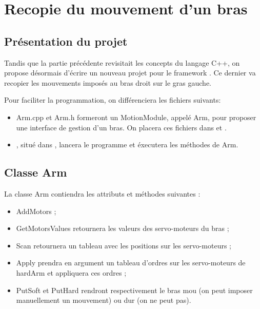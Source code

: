\documentclass[conference]{IEEEtran}
\begin{document}




\section{Recopie du mouvement d'un bras}
\label{sec:intro}

\subsection{Présentation du projet}
Tandis que la partie précédente revisitait les concepts du langage C++, on propose désormais d'écrire un nouveau projet pour le framework \darwin.
Ce dernier va recopier les mouvements imposés au bras droit sur le gras gauche.

Pour faciliter la programmation, on différenciera les fichiers suivants:
\begin{itemize}
    \item Arm.cpp et Arm.h formeront un MotionModule, appelé Arm,
    pour proposer une interface de gestion d'un bras. On placera ces fichiers dans  et .
    \item  {}, situé dans
    ,
    lancera le programme et éxecutera les méthodes de Arm.
\end{itemize}

\subsection{Classe Arm}

La classe Arm contiendra les attributs et méthodes suivantes :
\begin{itemize}
    \item AddMotors ;
    \item GetMotorsValues retournera les valeurs des servo-moteurs du bras ;
    \item Scan retournera un tableau avec les positions sur les servo-moteurs ;
    \item Apply prendra en argument un tableau d'ordres sur les servo-moteurs de hardArm et appliquera ces ordres ;
    \item PutSoft et PutHard rendront respectivement le bras mou (on peut imposer manuellement un mouvement) ou dur (on ne peut pas).
\end{itemize}
\end{document}

